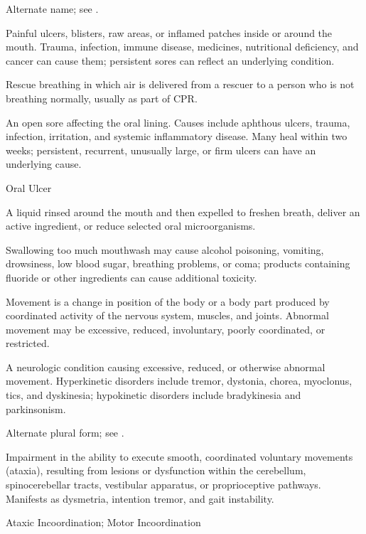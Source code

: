  Alternate name; see .

 Painful ulcers, blisters, raw areas, or inflamed patches inside or around the mouth. Trauma, infection, immune disease, medicines, nutritional deficiency, and cancer can cause them; persistent sores can reflect an underlying condition.

 Rescue breathing in which air is delivered from a rescuer to a person who is not breathing normally, usually as part of CPR.

 An open sore affecting the oral lining. Causes include aphthous ulcers, trauma, infection, irritation, and systemic inflammatory disease. Many heal within two weeks; persistent, recurrent, unusually large, or firm ulcers can have an underlying cause.

\synonyms
Oral Ulcer

 A liquid rinsed around the mouth and then expelled to freshen breath, deliver an active ingredient, or reduce selected oral microorganisms.

 Swallowing too much mouthwash may cause alcohol poisoning, vomiting, drowsiness, low blood sugar, breathing problems, or coma; products containing fluoride or other ingredients can cause additional toxicity.

 Movement is a change in position of the body or a body part produced by coordinated activity of the nervous system, muscles, and joints. Abnormal movement may be excessive, reduced, involuntary, poorly coordinated, or restricted.

 A neurologic condition causing excessive, reduced, or otherwise abnormal movement.
Hyperkinetic disorders include tremor, dystonia, chorea, myoclonus, tics, and
dyskinesia; hypokinetic disorders include bradykinesia and parkinsonism.

 Alternate plural form; see .

 Impairment in the ability to execute smooth, coordinated voluntary movements (ataxia), resulting from lesions or dysfunction within the cerebellum, spinocerebellar tracts, vestibular apparatus, or proprioceptive pathways. Manifests as dysmetria, intention tremor, and gait instability.

\synonyms
Ataxic Incoordination; Motor Incoordination

